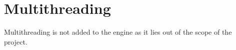\section{Multithreading}
Multithreading is not added to the engine as it lies out of the scope of the project.